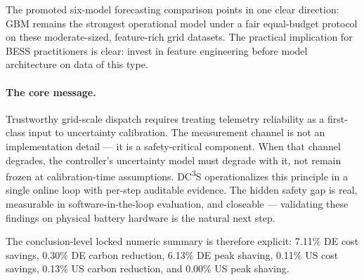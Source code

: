 \documentclass[11pt,a4paper]{article}
\begin{document}
The promoted six-model forecasting comparison points in one clear direction: GBM remains the strongest operational model under a fair equal-budget protocol on these moderate-sized, feature-rich grid datasets. The practical implication for BESS practitioners is clear: invest in feature engineering before model architecture on data of this type.

\paragraph{The core message.} Trustworthy grid-scale dispatch requires treating telemetry reliability as a first-class input to uncertainty calibration. The measurement channel is not an implementation detail --- it is a safety-critical component. When that channel degrades, the controller's uncertainty model must degrade with it, not remain frozen at calibration-time assumptions. DC\textsuperscript{3}S operationalizes this principle in a single online loop with per-step auditable evidence. The hidden safety gap is real, measurable in software-in-the-loop evaluation, and closeable --- validating these findings on physical battery hardware is the natural next step.

The conclusion-level locked numeric summary is therefore explicit: 7.11\% DE cost savings, 0.30\% DE carbon reduction, 6.13\% DE peak shaving, 0.11\% US cost savings, 0.13\% US carbon reduction, and 0.00\% US peak shaving.
\end{document}
